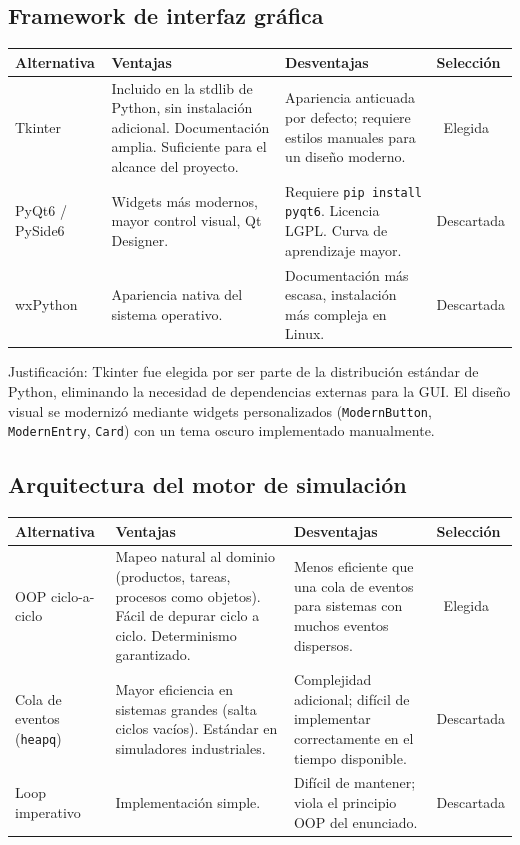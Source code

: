 \documentclass[12pt,letterpaper]{article}
\newcommand{\cmark}{\textcolor{accentgreen}{\ding{51}}}
\begin{document}
\subsection{Framework de interfaz gráfica}

\begin{center}
\renewcommand{\arraystretch}{1.25}
\begin{tabularx}{\textwidth}{|l|X|X|C{1.8cm}|}
\hline
\textbf{Alternativa} & \textbf{Ventajas} & \textbf{Desventajas} & \textbf{Selección} \\
\hline
Tkinter &
  Incluido en la stdlib de Python, sin instalación adicional. Documentación amplia. Suficiente para el alcance del proyecto. &
  Apariencia anticuada por defecto; requiere estilos manuales para un diseño moderno. &
  \cmark\ Elegida \\
\hline
PyQt6 / PySide6 &
  Widgets más modernos, mayor control visual, Qt Designer. &
  Requiere \texttt{pip install pyqt6}. Licencia LGPL. Curva de aprendizaje mayor. &
  Descartada \\
\hline
wxPython &
  Apariencia nativa del sistema operativo. &
  Documentación más escasa, instalación más compleja en Linux. &
  Descartada \\
\hline
\end{tabularx}
\end{center}

Justificación: Tkinter fue elegida por ser parte de la distribución estándar de Python,
eliminando la necesidad de dependencias externas para la GUI. El diseño visual se modernizó
mediante widgets personalizados (\texttt{ModernButton}, \texttt{ModernEntry}, \texttt{Card})
con un tema oscuro implementado manualmente.

\subsection{Arquitectura del motor de simulación}

\begin{center}
\renewcommand{\arraystretch}{1.25}
\begin{tabularx}{\textwidth}{|l|X|X|C{1.8cm}|}
\hline
\textbf{Alternativa} & \textbf{Ventajas} & \textbf{Desventajas} & \textbf{Selección} \\
\hline
OOP ciclo-a-ciclo &
  Mapeo natural al dominio (productos, tareas, procesos como objetos). Fácil de depurar ciclo a ciclo. Determinismo garantizado. &
  Menos eficiente que una cola de eventos para sistemas con muchos eventos dispersos. &
  \cmark\ Elegida \\
\hline
Cola de eventos (\texttt{heapq}) &
  Mayor eficiencia en sistemas grandes (salta ciclos vacíos). Estándar en simuladores industriales. &
  Complejidad adicional; difícil de implementar correctamente en el tiempo disponible. &
  Descartada \\
\hline
Loop imperativo &
  Implementación simple. &
  Difícil de mantener; viola el principio OOP del enunciado. &
  Descartada \\
\hline
\end{tabularx}
\end{center}
\end{document}
